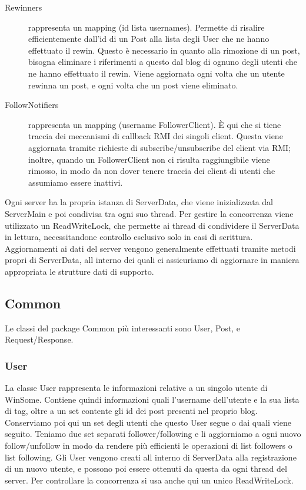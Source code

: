 \documentclass[11pt]{article}
\begin{document}
\begin{flushleft}
\begin{description}
\item[Rewinners] rappresenta un mapping (id \textrightarrow \space lista usernames). Permette di risalire efficientemente dall'id di un Post alla lista degli User che ne hanno effettuato il rewin.
Questo è necessario in quanto alla rimozione di un post, bisogna eliminare i riferimenti a questo dal blog di ognuno degli utenti che ne hanno effettuato il rewin. Viene aggiornata ogni volta che un utente rewinna un post, e ogni volta che un post viene eliminato.

\item[FollowNotifiers] rappresenta un mapping (username \textrightarrow \space FollowerClient). È qui che si tiene traccia dei meccanismi di callback RMI dei singoli client. Questa viene aggiornata tramite richieste di subscribe/unsubscribe del client via RMI; inoltre, quando un FollowerClient non ci risulta raggiungibile viene rimosso, in modo da non dover tenere traccia dei client di utenti che assumiamo essere inattivi.

\end{description}

Ogni server ha la propria istanza di ServerData, che viene inizializzata dal ServerMain e poi condivisa tra ogni suo thread. Per gestire la concorrenza viene utilizzato un ReadWriteLock, che permette ai thread di condividere il ServerData in lettura, necessitandone controllo esclusivo solo in casi di scrittura.
Aggiornamenti ai dati del server vengono generalmente effettuati tramite metodi propri di ServerData, all interno dei quali ci assicuriamo di aggiornare in maniera appropriata le strutture dati di supporto.

\subsection{Common}

Le classi del package Common più interessanti sono User, Post, e Request/Response.

\subsubsection{User}

La classe User rappresenta le informazioni relative a un singolo utente di WinSome.
Contiene quindi informazioni quali l'username dell'utente e la sua lista  di tag, oltre a un set contente gli id dei post presenti nel proprio blog. Conserviamo poi qui un set degli utenti che questo User segue o dai quali viene seguito. Teniamo due set separati follower/following e li aggiorniamo a ogni nuovo follow/unfollow in modo da rendere più efficienti le operazioni di list followers o list following. Gli User vengono creati all interno di ServerData alla registrazione di un nuovo utente, e possono poi essere ottenuti da questa da ogni thread del server. Per controllare la concorrenza si usa anche qui un unico ReadWriteLock.


\end{flushleft}
\end{document}
